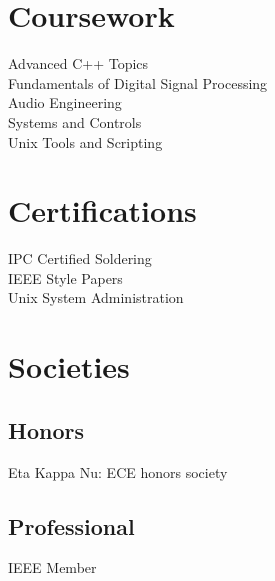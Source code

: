 \documentclass[a4paper]{deedy-resume-openfont} %
\begin{document}
\begin{minipage}[t]{0.33\textwidth}
\section{Coursework}

Advanced C++ Topics \\
Fundamentals of Digital Signal Processing \\
Audio Engineering \\
 Systems and Controls\\
Unix Tools and Scripting

\section{Certifications}
IPC Certified Soldering \\
IEEE Style Papers \\
Unix System  Administration

\section{Societies}
\subsection{Honors}
 Eta Kappa Nu: ECE honors society \\
\subsection{Professional}
IEEE Member

\sectionspace %

\end{minipage} %
\hfill
%
%
\end{document}
